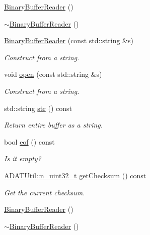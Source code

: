 \begin{DoxyCompactItemize}
\mbox{\hyperlink{classADATIO_1_1BinaryBufferReader_a9bb5e29231fc81acbe7f0e6ab2720f6c}{Binary\+Buffer\+Reader}} ()
\item 
\mbox{\hyperlink{classADATIO_1_1BinaryBufferReader_ab890177a0ac7f1e191ebd15d148fc48b}{$\sim$\+Binary\+Buffer\+Reader}} ()
\item 
\mbox{\hyperlink{classADATIO_1_1BinaryBufferReader_af3ef435054f2f29a596ca4b45b3642e5}{Binary\+Buffer\+Reader}} (const std\+::string \&s)
\begin{DoxyCompactList}\small\item\em Construct from a string. \end{DoxyCompactList}\item 
void \mbox{\hyperlink{classADATIO_1_1BinaryBufferReader_af56c8d00474a1f38f38267c45aa7b433}{open}} (const std\+::string \&s)
\begin{DoxyCompactList}\small\item\em Construct from a string. \end{DoxyCompactList}\item 
std\+::string \mbox{\hyperlink{classADATIO_1_1BinaryBufferReader_a1e960fee8100fbe85f706b45870d95e1}{str}} () const
\begin{DoxyCompactList}\small\item\em Return entire buffer as a string. \end{DoxyCompactList}\item 
bool \mbox{\hyperlink{classADATIO_1_1BinaryBufferReader_ad7957f285235c272d8874d1ab5ffea75}{eof}} () const
\begin{DoxyCompactList}\small\item\em Is it empty? \end{DoxyCompactList}\item 
\mbox{\hyperlink{namespaceADATUtil_ad945a8afa4db2d1f89b731964adae97e}{A\+D\+A\+T\+Util\+::n\+\_\+uint32\+\_\+t}} \mbox{\hyperlink{classADATIO_1_1BinaryBufferReader_ae8e6c22be76223f5e2ce2613e70be4bf}{get\+Checksum}} () const
\begin{DoxyCompactList}\small\item\em Get the current checksum. \end{DoxyCompactList}\item 
\mbox{\hyperlink{classADATIO_1_1BinaryBufferReader_a9bb5e29231fc81acbe7f0e6ab2720f6c}{Binary\+Buffer\+Reader}} ()
\item 
\mbox{\hyperlink{classADATIO_1_1BinaryBufferReader_ab890177a0ac7f1e191ebd15d148fc48b}{$\sim$\+Binary\+Buffer\+Reader}} ()
\item 

\end{DoxyCompactItemize}
